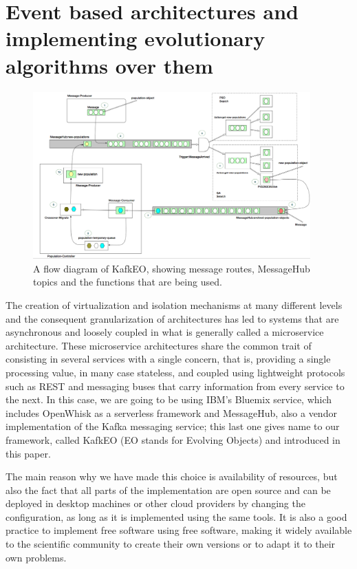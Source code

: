 \documentclass[sigconf]{acmart}
\begin{document}
\section{Event based architectures and implementing evolutionary
  algorithms over them}
\label{sec:methods}
%
\begin{figure}[h!tbp]
\includegraphics[width=0.95\textwidth]{img/kafkEO.png}
\caption{A flow diagram of KafkEO, showing message routes, MessageHub
  topics and the functions that are being used.}
\label{fig:kafkeo2}
\end{figure}
%
The creation of virtualization and isolation mechanisms at many
different levels and the consequent granularization of architectures
has led to systems that are asynchronous and loosely coupled in what
is generally called a microservice architecture. These microservice
architectures share the common trait of consisting in several services
with a single concern, that is, providing a single processing value,
in many case stateless, and coupled using lightweight protocols such
as REST and messaging buses that carry information from every service
to the next. In this case, we are going to be using IBM's Bluemix
service, which includes OpenWhisk as a serverless framework and
MessageHub, also a vendor implementation of the Kafka messaging
service; this last one gives name to our framework, called KafkEO (EO
stands for Evolving Objects) and introduced in this paper.

The main reason why we have made this choice is availability of
resources, but also
the fact that all parts of the implementation are open source and can
be deployed in desktop machines or other cloud providers by changing
the configuration, as long as it is implemented using the same tools. It is also a good practice to implement free
software using free software, making it widely available to the
scientific community to create their own versions or to adapt it to
their own problems.
\end{document}
